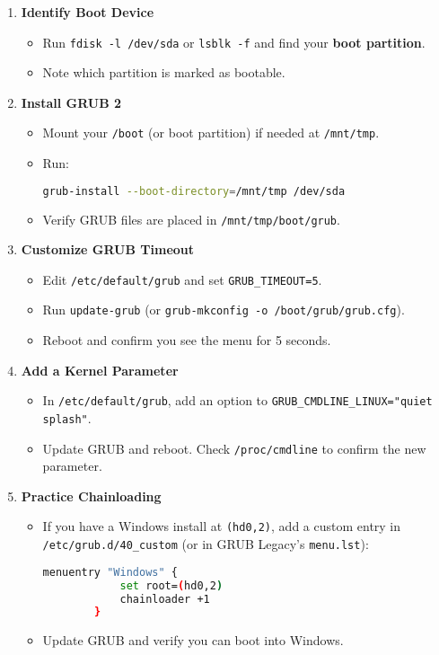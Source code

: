 \documentclass[12pt,a4paper]{report}
\begin{document}
\begin{enumerate}
    \item \textbf{Identify Boot Device}  
    \begin{itemize}
        \item Run \texttt{fdisk -l /dev/sda} or \texttt{lsblk -f} and find your \textbf{boot partition}.  
        \item Note which partition is marked as bootable.
    \end{itemize}

    \item \textbf{Install GRUB 2}  
    \begin{itemize}
        \item Mount your \texttt{/boot} (or boot partition) if needed at \texttt{/mnt/tmp}.  
        \item Run:
        \begin{lstlisting}[language=bash]
        grub-install --boot-directory=/mnt/tmp /dev/sda
        \end{lstlisting}
        \item Verify GRUB files are placed in \texttt{/mnt/tmp/boot/grub}.
    \end{itemize}

    \item \textbf{Customize GRUB Timeout}  
    \begin{itemize}
        \item Edit \texttt{/etc/default/grub} and set \texttt{GRUB\_TIMEOUT=5}.  
        \item Run \texttt{update-grub} (or \texttt{grub-mkconfig -o /boot/grub/grub.cfg}).  
        \item Reboot and confirm you see the menu for 5 seconds.
    \end{itemize}

    \item \textbf{Add a Kernel Parameter}  
    \begin{itemize}
        \item In \texttt{/etc/default/grub}, add an option to \texttt{GRUB\_CMDLINE\_LINUX="quiet splash"}.  
        \item Update GRUB and reboot. Check \texttt{/proc/cmdline} to confirm the new parameter.
    \end{itemize}

    \item \textbf{Practice Chainloading}  
    \begin{itemize}
        \item If you have a Windows install at \texttt{(hd0,2)}, add a custom entry in \texttt{/etc/grub.d/40\_custom} (or in GRUB Legacy’s \texttt{menu.lst}):
        \begin{lstlisting}[language=bash]
        menuentry "Windows" {
            set root=(hd0,2)
            chainloader +1
        }
        \end{lstlisting}
        \item Update GRUB and verify you can boot into Windows.
    \end{itemize}


\end{enumerate}
\end{document}
